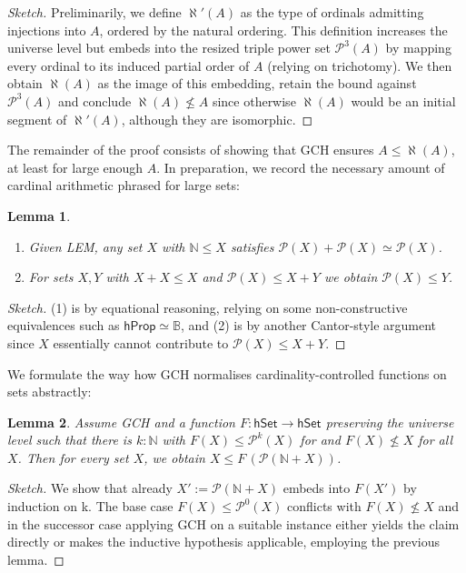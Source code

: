 \documentclass{easychair}
\newcommand{\nat}{\mathbb{N}}
\newcommand{\bool}{\mathbb{B}}
\newcommand{\pow}{\mathcal{P}}
\newcommand{\hprop}{\mathsf{hProp}}
\newcommand{\hset}{\mathsf{hSet}}
\newtheorem{lemma}{Lemma}
\begin{document}
\begin{proof}[Sketch]
	Preliminarily, we define $\aleph'(A)$ as the type of ordinals admitting injections into $A$, ordered by the natural ordering.
	This definition increases the universe level but embeds into the resized triple power set $\pow^3(A)$ by mapping every ordinal to its induced partial order of $A$ (relying on trichotomy).
	We then obtain $\aleph(A)$ as the image of this embedding, retain the bound against $\pow^3(A)$ and conclude $\aleph(A)\not\le A$ since otherwise $\aleph(A)$ would be an initial segment of $\aleph'(A)$, although they are isomorphic.
\end{proof}

The remainder of the proof consists of showing that GCH ensures $A\le\aleph(A)$, at least for large enough $A$.
In preparation, we record the necessary amount of cardinal arithmetic phrased for large sets:

\begin{lemma}
	\begin{enumerate}[noitemsep]
		\item
		Given LEM, any set $X$ with $\nat\le X$ satisfies $\pow(X)+\pow(X)\simeq \pow(X)$.
		\item
		For sets $X,Y$ with $X+X\le X$ and $\pow (X)\le X+Y$ we obtain $\pow (X)\le Y$.
	\end{enumerate}
\end{lemma}
\begin{proof}[Sketch]
	(1) is by equational reasoning, relying on some non-constructive equivalences such as $\hprop\simeq\bool$, and (2) is by another Cantor-style argument since $X$ essentially cannot contribute to $\pow (X)\le X+Y$.
\end{proof}

We formulate the way how GCH normalises cardinality-controlled functions on sets abstractly:

\begin{lemma}
	Assume GCH and a function $F:\hset\to\hset$ preserving the universe level such that there is $k:\nat$ with $F(X)\le \pow^k(X)$ for and $F(X)\not\le X$ for all $X$.
	Then for every set $X$, we obtain $X\le F\,(\pow(\nat + X))$.
\end{lemma}

\begin{proof}[Sketch]
	We show that already $X':=\pow(\nat + X)$ embeds into $F(X')$ by induction on k.
	The base case $F(X)\le \pow^0(X)$ conflicts with $F(X)\not\le X$ and in the successor case applying GCH on a suitable instance either yields the claim directly or makes the inductive hypothesis applicable, employing the previous lemma.
\end{proof}
\end{document}

